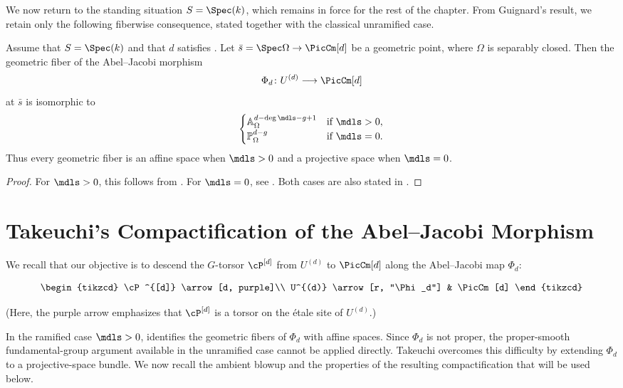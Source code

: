 We now return to the standing situation $S=\Spec(k)$, which remains in
force for the rest of the chapter. From Guignard's result, we retain only
the following fiberwise consequence, stated together with the classical
unramified case.
\begin{theorem}\label{theorem:abel-jacobi-fibers}
Assume that $S=\Spec(k)$ and that $d$ satisfies
. Let
$\bar s=\Spec\Omega\to\PicCm[d]$ be a geometric point, where $\Omega$ is
separably closed. Then the geometric fiber of the Abel--Jacobi morphism
\[
    \Phi_d\colon U^{(d)}\longrightarrow\PicCm[d]
\]
at $\bar s$ is isomorphic to
\[
\begin{cases}
\mathbb{A}_{\Omega}^{d - \deg \mdls - g + 1} & \text{if } \mdls > 0, \\
\mathbb{P}_{\Omega}^{d - g} & \text{if } \mdls = 0.
\end{cases}
\]
Thus every geometric fiber is an affine space when $\mdls>0$ and a
projective space when $\mdls=0$.
\end{theorem}
\begin{proof}
For $\mdls>0$, this follows from
\cite[Proposition~4.14]{Guignard2018}. For $\mdls=0$, see
\cite[Proposition~2.1.4]{Toth2011}.
Both cases are also stated in
\cite[Propositions~3.13--3.14]{tendler2015geometricclassfieldtheory}.
\end{proof}

\section{Takeuchi's Compactification of the Abel--Jacobi Morphism}\label{section:BlowupOfSymmetricPowerOfCurves}
We recall that our objective is to descend the $G$-torsor $\cP^{[d]}$ from
$U^{(d)}$ to $\PicCm[d]$ along the Abel--Jacobi map $\Phi_d$:

\[
\begin{tikzcd}
 \cP^{[d]} \arrow[d, purple]\\
 U^{(d)} \arrow[r, "\Phi_d"] & \PicCm[d]
\end{tikzcd}
\]


(Here, the purple arrow emphasizes that $\cP^{[d]}$ is a torsor on the
\'etale site of $U^{(d)}$.)

In the ramified case $\mdls>0$, 
identifies the geometric fibers of $\Phi_d$ with affine spaces. Since
$\Phi_d$ is not proper, the proper-smooth fundamental-group argument
available in the unramified case cannot be applied directly. Takeuchi
\cite[\S3]{takeuchi2018blow} overcomes this difficulty by extending $\Phi_d$
to a projective-space bundle. We now recall the ambient blowup and the
properties of the resulting compactification that will be used below.

